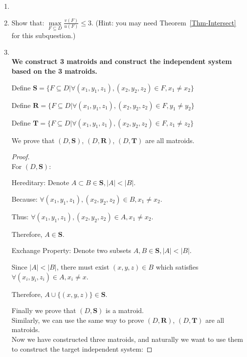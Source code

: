 \documentclass[12pt,a4paper]{article}
\makeatletter
\newtheorem*{solution}{Solution}
\theoremstyle{definition}
\renewenvironment{solution}[1][Solution] {\par\pushQED{\qed}\normalfont\topsep6\p@\@plus6\p@\relax\trivlist\item[\hskip\labelsep\bfseries#1\@addpunct{.}]\ignorespaces}{\popQED\endtrivlist\@endpefalse} \makeatother
\makeatother
\begin{document}
\begin{enumerate}
\begin{enumerate}
\begin{solution}
\begin{table}[H]
\begin{tabular}{|c|c|c|c|}
			\end{tabular}
		\end{table}
	\end{solution}
    	\item Show that: $\max\limits_{F \subseteq D} \frac{v(F)}{u(F)} \leq 3$. {\color{blue}(Hint: you may need Theorem~\ref{Thm-Intersect} for this subquestion.)} 
    	    \begin{solution}
	    ~\\
	    \textbf{We construct 3 matroids and construct the independent system based on the 3 matroids.}
	    
	    Define $\mathbf{S}=\{F\subseteq D| \forall (x_1,y_1,z_1), (x_2,y_2,z_2) \in F, x_1\neq x_2 \}$
	    
	    	    Define $\mathbf{R}=\{F\subseteq D| \forall (x_1,y_1,z_1), (x_2,y_2,z_2) \in F, y_1\neq y_2 \}$
		    
		    	    Define $\mathbf{T}=\{F\subseteq D| \forall (x_1,y_1,z_1), (x_2,y_2,z_2) \in F, z_1\neq z_2 \}$
		
		We prove that    $(D, \mathbf{S})$, $(D, \mathbf{R})$, $(D, \mathbf{T})$ are all matroids.
		
	\begin{proof}
	~\\
	For $(D, \mathbf{S})$:
	
	{\color{blue}Hereditary}: Denote $A\subset B \in \mathbf{S}, |A|<|B|$. 
	
	Because: $\forall (x_1,y_1,z_1), (x_2,y_2,z_2) \in B, x_1\neq x_2 $.
	
	Thus: $\forall (x_1,y_1,z_1), (x_2,y_2,z_2) \in A, x_1\neq x_2 $.
	
	Therefore, $A\in \mathbf{S}$.
	
		{\color{blue}Exchange Property}: Denote two subsets $A, B \in \mathbf{S}, |A| < |B|$.
		
		Since $|A|<|B|$, there must exist $(x, y, z)\in B$ which satisfies $\forall (x_i,y_i,z_i) \in A, x_i \neq x$.
		
		Therefore, $A\cup \{(x,y,z)\} \in \mathbf{S}$.
		
	Finally we prove that $(D, \mathbf{S})$ is a matroid.
~\\
	
Similarly, we can use the same way to prove $(D, \mathbf{R})$, $(D, \mathbf{T})$ are all matroids.
~\\

Now we have constructed three matroids, and naturally we want to use them to construct the target independent system:


\end{proof}
\end{solution}
\end{enumerate}
\end{enumerate}
\end{document}
